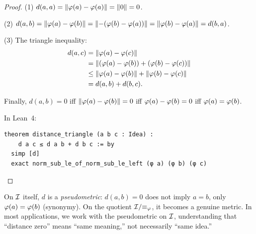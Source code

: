 \begin{proof}
(1) $d(a, a) = \lVert \varphi(a) - \varphi(a) \rVert = \lVert 0 \rVert = 0$.

(2) $d(a, b) = \lVert \varphi(a) - \varphi(b) \rVert = \lVert -(\varphi(b) - \varphi(a)) \rVert
= \lVert \varphi(b) - \varphi(a) \rVert = d(b, a)$.

(3) The triangle inequality:
\begin{align*}
  d(a, c) &= \lVert \varphi(a) - \varphi(c) \rVert \\
  &= \lVert (\varphi(a) - \varphi(b)) + (\varphi(b) - \varphi(c)) \rVert \\
  &\leq \lVert \varphi(a) - \varphi(b) \rVert + \lVert \varphi(b) - \varphi(c) \rVert \\
  &= d(a, b) + d(b, c).
\end{align*}

Finally, $d(a, b) = 0$ iff $\lVert \varphi(a) - \varphi(b) \rVert = 0$ iff $\varphi(a) -
\varphi(b) = 0$ iff $\varphi(a) = \varphi(b)$.

In Lean~4:
\begin{lstlisting}
theorem distance_triangle (a b c : Idea) :
    d a c ≤ d a b + d b c := by
  simp [d]
  exact norm_sub_le_of_norm_sub_le_left (φ a) (φ b) (φ c)
\end{lstlisting}
\end{proof}

\begin{remark}
On $\mathcal{I}$ itself, $d$ is a \emph{pseudometric}: $d(a, b) = 0$ does not imply
$a = b$, only $\varphi(a) = \varphi(b)$ (synonymy). On the quotient $\mathcal{I} /
{\equiv_\varphi}$, it becomes a genuine metric. In most applications, we work
with the pseudometric on $\mathcal{I}$, understanding that ``distance zero'' means
``same meaning,'' not necessarily ``same idea.''
\end{remark}

